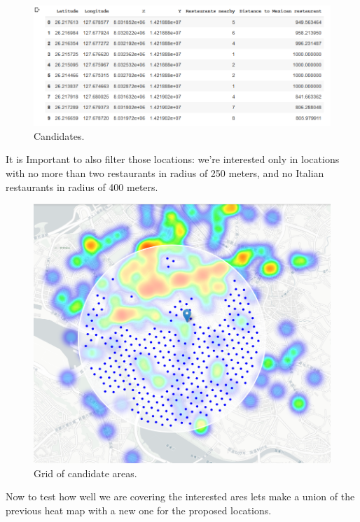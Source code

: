 \documentclass[11pt]{article}
\begin{document}
\begin{figure}[H]
    \centering
        \includegraphics[scale=.8]{figures/cm7.png}
    \caption{Candidates.}
    \label{fig:1}
\end{figure}

It is Important to also  filter those locations: we're interested only in locations with no more than two restaurants in radius of 250 meters, and no Italian restaurants in radius of 400 meters.

\begin{figure}[H]
    \centering
        \includegraphics[scale=.4]{figures/cm8.png}
    \caption{Grid of candidate areas.}
    \label{fig:1}
\end{figure}


Now to test how well we are covering the interested ares lets make a union of the previous heat map with a new one for the proposed locations.
\end{document}
